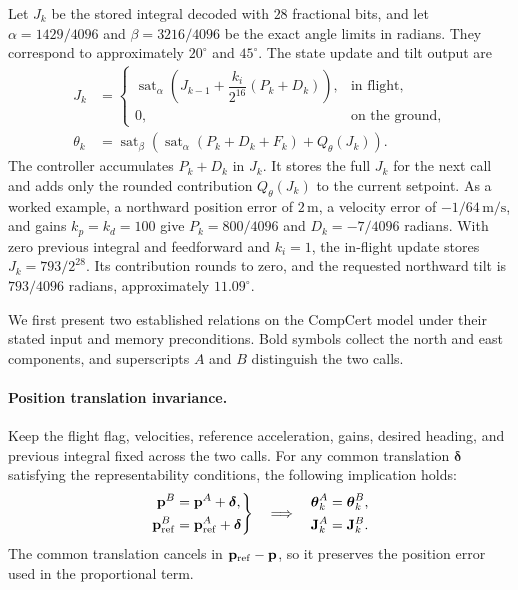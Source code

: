 \documentclass[manuscript, screen, review]{acmart}
\begin{document}
Let $J_k$ be the stored integral decoded with $28$ fractional bits, and
let $\alpha=1429/4096$ and $\beta=3216/4096$ be the exact angle limits
in radians. They correspond to approximately $20^\circ$ and $45^\circ$.
The state update and tilt output are
\begin{align}
 J_k &=
 \begin{cases}
 \operatorname{sat}_{\alpha}\!\left(
   J_{k-1}+\dfrac{k_i}{2^{16}}(P_k+D_k)\right),
    & \text{in flight},\\
 0, & \text{on the ground},
 \end{cases}\\
 \theta_k
 &= \operatorname{sat}_{\beta}\!\left(
      \operatorname{sat}_{\alpha}(P_k+D_k+F_k)+Q_\theta(J_k)\right).
 \label{eq:paparazzi-tilt}
\end{align}
The controller accumulates $P_k+D_k$ in $J_k$. It stores the full
$J_k$ for the next call and adds only the rounded contribution
$Q_\theta(J_k)$ to the current setpoint. As a worked example, a northward
position error of $2\,\mathrm{m}$, a velocity error of
$-1/64\,\mathrm{m/s}$, and gains $k_p=k_d=100$ give
$P_k=800/4096$ and $D_k=-7/4096$ radians. With zero previous integral
and feedforward and $k_i=1$, the in-flight update stores
$J_k=793/2^{28}$. Its contribution rounds to zero, and the requested
northward tilt is $793/4096$ radians, approximately $11.09^\circ$.

We first present two established relations on the CompCert model under
their stated input and memory preconditions. Bold symbols collect the
north and east components, and superscripts $A$ and $B$ distinguish
the two calls.

\paragraph{Position translation invariance.}
Keep the flight flag, velocities, reference acceleration, gains, desired
heading, and previous integral fixed across the two calls. For any common
translation $\boldsymbol{\delta}$ satisfying the representability
conditions, the following implication holds:
\begin{equation}
\left.
\begin{aligned}
\mathbf p^B &= \mathbf p^A+\boldsymbol{\delta},\\
\mathbf p_{\rm ref}^B &= \mathbf p_{\rm ref}^A+\boldsymbol{\delta}
\end{aligned}
\right\}
\quad\Longrightarrow\quad
\begin{aligned}
\boldsymbol{\theta}_k^A &= \boldsymbol{\theta}_k^B,\\
\mathbf J_k^A &= \mathbf J_k^B.
\end{aligned}
\label{eq:paparazzi-translation}
\end{equation}
The common translation cancels in $\mathbf p_{\rm ref}-\mathbf p$,
so it preserves the position error used in the proportional term.
\end{document}
